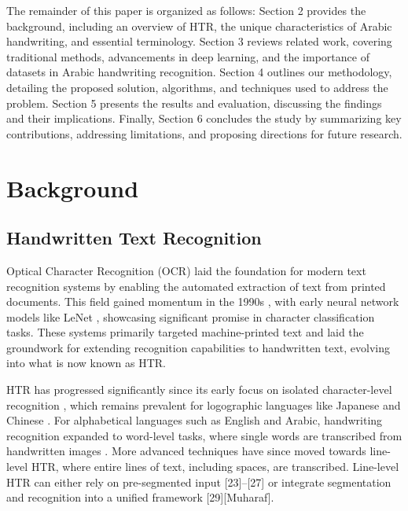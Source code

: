 \documentclass[conference]{IEEEtran}
\begin{document}
The remainder of this paper is organized as follows: Section 2 provides the background, including an overview of HTR, the unique characteristics of Arabic handwriting, and essential terminology. Section 3 reviews related work, covering traditional methods, advancements in deep learning, and the importance of datasets in Arabic handwriting recognition. Section 4 outlines our methodology, detailing the proposed solution, algorithms, and techniques used to address the problem. Section 5 presents the results and evaluation, discussing the findings and their implications. Finally, Section 6 concludes the study by summarizing key contributions, addressing limitations, and proposing directions for future research.


\section{Background}

\subsection{Handwritten Text Recognition}

Optical Character Recognition (OCR) laid the foundation for modern text recognition systems by enabling the automated extraction of text from printed documents. This field gained momentum in the 1990s \cite{parvez2013offline}, with early neural network models like LeNet \cite{lecun1998gradient}, showcasing significant promise in character classification tasks. These systems primarily targeted machine-printed text and laid the groundwork for extending recognition capabilities to handwritten text, evolving into what is now known as HTR.

HTR has progressed significantly since its early focus on isolated character-level recognition \cite{cilia2019ranking}, which remains prevalent for logographic languages like Japanese \cite{clanuwat2019kuronet}  and Chinese \cite{jaderberg2015spatial}. For alphabetical languages such as English and Arabic, handwriting recognition expanded to word-level tasks, where single words are transcribed from handwritten images \cite{bhunia2019handwriting, such2018fully}. More advanced techniques have since moved towards line-level HTR, where entire lines of text, including spaces, are transcribed. Line-level HTR can either rely on pre-segmented input [23]–[27] or integrate segmentation and recognition into a unified framework [29][Muharaf].
\end{document}
